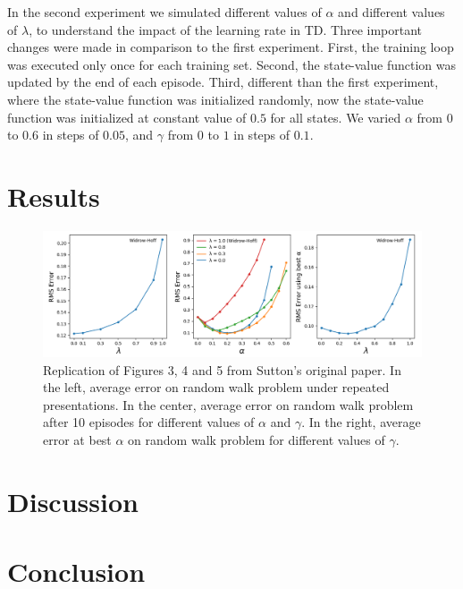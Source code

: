\documentclass{article}
\begin{document}
In the second experiment we simulated different values of $\alpha$ and different values of $\lambda$, to understand the impact of the learning rate in TD.
Three important changes were made in comparison to the first experiment.
First, the training loop was executed only once for each training set.
Second, the state-value function was updated by the end of each episode.
Third, different than the first experiment, where the state-value function was initialized randomly, now the state-value function was initialized at constant value of $0.5$ for all states.
We varied $\alpha$ from $0$ to $0.6$ in steps of $0.05$, and $\gamma$ from $0$
 to $1$ in steps of $0.1$.

\section{Results}
\label{sec:results}

\begin{figure}[t]
    \includegraphics[width=\textwidth]{./images/figure.png}
    \centering
    \caption{Replication of Figures 3, 4 and 5 from Sutton's original paper.
    In the left, average error on random walk problem under repeated presentations.
    In the center, average error on random walk problem after 10 episodes for different values of $\alpha$ and $\gamma$.
    In the right, average error at best $\alpha$ on random walk problem for different values of $\gamma$.}
\end{figure}


\lipsum[2]
\lipsum[3]

\section{Discussion}
\label{sec:discussion}
\lipsum[2]
\lipsum[3]

\section{Conclusion}
\label{sec:conclusion}
\lipsum[2]
\lipsum[3]
\end{document}
